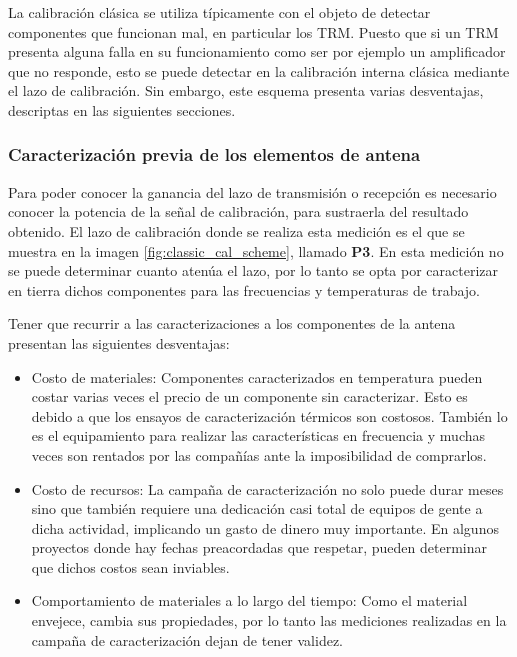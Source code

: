 La calibración clásica se utiliza típicamente con el objeto de detectar componentes que funcionan mal, en particular los
TRM. Puesto que si un TRM presenta alguna falla en su funcionamiento como ser por ejemplo un amplificador que no responde, esto
se puede detectar en la calibración interna clásica mediante el lazo de calibración. Sin embargo, este esquema presenta varias
desventajas, descriptas en las siguientes secciones.


\subsubsection{Caracterización previa de los elementos de antena}

Para poder conocer la ganancia del lazo de transmisión o recepción es necesario conocer la potencia de la señal de
calibración, para sustraerla del resultado obtenido. El lazo de calibración donde se realiza esta medición es el que se
muestra en la imagen \ref{fig:classic_cal_scheme}, llamado \textbf{P3}. En esta medición no se puede determinar cuanto atenúa
el lazo, por lo tanto se opta por caracterizar en tierra dichos componentes para las frecuencias y temperaturas de trabajo.

Tener que recurrir a las caracterizaciones a los componentes de la antena presentan las siguientes desventajas: 

\begin{itemize}
	\item Costo de materiales: Componentes caracterizados en temperatura pueden costar varias veces el precio de un componente sin
		caracterizar. Esto es debido a que los ensayos de caracterización térmicos son costosos. También lo es el equipamiento para
		realizar las características en frecuencia y muchas veces son rentados por las compañías ante la imposibilidad de comprarlos.
	\item Costo de recursos: La campaña de caracterización no solo puede durar meses sino que también requiere una dedicación
		casi total de equipos de gente a dicha actividad, implicando un gasto de dinero muy importante. En algunos proyectos donde hay
		fechas preacordadas que respetar, pueden determinar que dichos costos sean inviables.
	\item Comportamiento de materiales a lo largo del tiempo: Como el material envejece, cambia sus propiedades, por lo tanto las mediciones
		realizadas en la campaña de caracterización dejan de tener validez.
\end{itemize}


